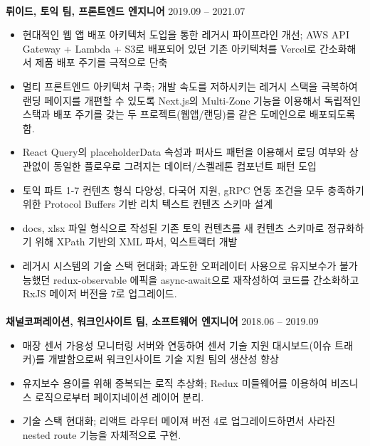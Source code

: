 \documentclass{article}
\begin{document}
\paragraph{}
\textbf{뤼이드, 토익 팀, 프론트엔드 엔지니어} \hfill 2019.09 -- 2021.07
\begin{itemize}
    \setlength\itemsep{0.1em}
    \item 현대적인 웹 앱 배포 아키텍처 도입을 통한 레거시 파이프라인 개선; AWS API Gateway + Lambda + S3로 배포되어 있던 기존 아키텍처를 Vercel로 간소화해서 제품 배포 주기를 극적으로 단축
    \item 멀티 프론트엔드 아키텍처 구축; 개발 속도를 저하시키는 레거시 스택을 극복하여 랜딩 페이지를 개편할 수 있도록 Next.js의 Multi-Zone 기능을 이용해서 독립적인 스택과 배포 주기를 갖는 두 프로젝트(웹앱/랜딩)를 같은 도메인으로 배포되도록 함.
    \item React Query의 placeholderData 속성과 퍼사드 패턴을 이용해서 로딩 여부와 상관없이 동일한 플로우로 그려지는 데이터/스켈레톤 컴포넌트 패턴 도입
     \item 토익 파트 1-7 컨텐츠 형식 다양성, 다국어 지원, gRPC 연동 조건을 모두 충족하기 위한 Protocol Buffers 기반 리치 텍스트 컨텐츠 스키마 설계
     \item docs, xlsx 파일 형식으로 작성된 기존 토익 컨텐츠를 새 컨텐츠 스키마로 정규화하기 위해 XPath 기반의 XML 파서, 익스트랙터 개발
     \item 레거시 시스템의 기술 스택 현대화; 과도한 오퍼레이터 사용으로 유지보수가 불가능했던 redux-observable 에픽을 async-await으로 재작성하여 코드를 간소화하고 RxJS 메이저 버전을 7로 업그레이드.
\end{itemize}
\paragraph{}
\textbf{채널코퍼레이션, 워크인사이트 팀, 소프트웨어 엔지니어} \hfill 2018.06 -- 2019.09
\begin{itemize}
     \setlength\itemsep{0.1em}
     \item 매장 센서 가용성 모니터링 서버와 연동하여 센서 기술 지원 대시보드(이슈 트래커)를 개발함으로써 워크인사이트 기술 지원 팀의 생산성 향상
     \item 유지보수 용이를 위해 중복되는 로직 추상화; Redux 미들웨어를 이용하여 비즈니스 로직으로부터 페이지네이션 레이어 분리.
     \item 기술 스택 현대화; 리액트 라우터 메이져 버전 4로 업그레이드하면서 사라진 nested route 기능을 자체적으로 구현.
\end{itemize}
\end{document}
